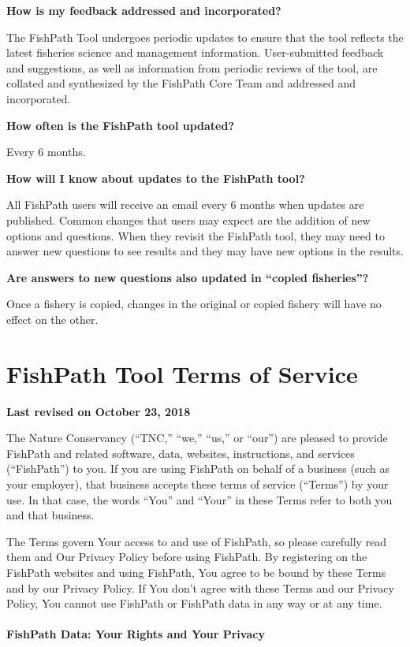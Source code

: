 \documentclass[
  11pt,
]{book}
\begin{document}
\textbf{How is my feedback addressed and incorporated?}

The FishPath Tool undergoes periodic updates to ensure that the tool reflects the latest fisheries science and management information. User-submitted feedback and suggestions, as well as information from periodic reviews of the tool, are collated and synthesized by the FishPath Core Team and addressed and incorporated.

\textbf{How often is the FishPath tool updated?}

Every 6 months.

\textbf{How will I know about updates to the FishPath tool?}

All FishPath users will receive an email every 6 months when updates are published. Common changes that users may expect are the addition of new options and questions. When they revisit the FishPath tool, they may need to answer new questions to see results and they may have new options in the results.

\textbf{Are answers to new questions also updated in ``copied fisheries''?}

Once a fishery is copied, changes in the original or copied fishery will have no effect on the other.

\hypertarget{terms}{%
\chapter{FishPath Tool Terms of Service}\label{terms}}

\textbf{Last revised on October 23, 2018}

The Nature Conservancy (``TNC,'' ``we,'' ``us,'' or ``our'') are pleased to provide FishPath and related software, data, websites, instructions, and services (``FishPath'') to you. If you are using FishPath on behalf of a business (such as your employer), that business accepts these terms of service (``Terms'') by your use. In that case, the words ``You'' and ``Your'' in these Terms refer to both you and that business.

The Terms govern Your access to and use of FishPath, so please carefully read them and Our Privacy Policy before using FishPath. By registering on the FishPath websites and using FishPath, You agree to be bound by these Terms and by our Privacy Policy. If You don't agree with these Terms and our Privacy Policy, You cannot use FishPath or FishPath data in any way or at any time.

\hypertarget{fishpath-data-your-rights-and-your-privacy}{%
\subsubsection*{FishPath Data: Your Rights and Your Privacy}\label{fishpath-data-your-rights-and-your-privacy}}
\end{document}
